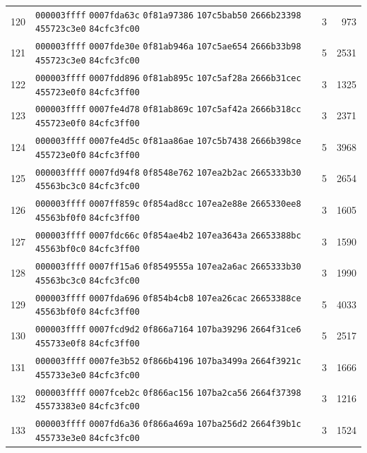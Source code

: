 \begin{longtable}{@{}r p{12cm} r r@{}}
120 & \texttt{000003ffff} \texttt{0007fda63c} \texttt{0f81a97386} \texttt{107c5bab50} \texttt{2666b23398} \texttt{455723c3e0} \texttt{84cfc3fc00} & 3 & 973 \\
121 & \texttt{000003ffff} \texttt{0007fde30e} \texttt{0f81ab946a} \texttt{107c5ae654} \texttt{2666b33b98} \texttt{455723c3e0} \texttt{84cfc3fc00} & 5 & 2531 \\
122 & \texttt{000003ffff} \texttt{0007fdd896} \texttt{0f81ab895c} \texttt{107c5af28a} \texttt{2666b31cec} \texttt{455723e0f0} \texttt{84cfc3ff00} & 3 & 1325 \\
123 & \texttt{000003ffff} \texttt{0007fe4d78} \texttt{0f81ab869c} \texttt{107c5af42a} \texttt{2666b318cc} \texttt{455723e0f0} \texttt{84cfc3ff00} & 3 & 2371 \\
124 & \texttt{000003ffff} \texttt{0007fe4d5c} \texttt{0f81aa86ae} \texttt{107c5b7438} \texttt{2666b398ce} \texttt{455723e0f0} \texttt{84cfc3ff00} & 5 & 3968 \\
125 & \texttt{000003ffff} \texttt{0007fd94f8} \texttt{0f8548e762} \texttt{107ea2b2ac} \texttt{2665333b30} \texttt{45563bc3c0} \texttt{84cfc3fc00} & 5 & 2654 \\
126 & \texttt{000003ffff} \texttt{0007ff859c} \texttt{0f854ad8cc} \texttt{107ea2e88e} \texttt{2665330ee8} \texttt{45563bf0f0} \texttt{84cfc3ff00} & 3 & 1605 \\
127 & \texttt{000003ffff} \texttt{0007fdc66c} \texttt{0f854ae4b2} \texttt{107ea3643a} \texttt{26653388bc} \texttt{45563bf0c0} \texttt{84cfc3ff00} & 3 & 1590 \\
128 & \texttt{000003ffff} \texttt{0007ff15a6} \texttt{0f8549555a} \texttt{107ea2a6ac} \texttt{2665333b30} \texttt{45563bc3c0} \texttt{84cfc3fc00} & 3 & 1990 \\
129 & \texttt{000003ffff} \texttt{0007fda696} \texttt{0f854b4cb8} \texttt{107ea26cac} \texttt{26653388ce} \texttt{45563bf0f0} \texttt{84cfc3ff00} & 5 & 4033 \\
130 & \texttt{000003ffff} \texttt{0007fcd9d2} \texttt{0f866a7164} \texttt{107ba39296} \texttt{2664f31ce6} \texttt{455733e0f8} \texttt{84cfc3ff00} & 5 & 2517 \\
131 & \texttt{000003ffff} \texttt{0007fe3b52} \texttt{0f866b4196} \texttt{107ba3499a} \texttt{2664f3921c} \texttt{455733e3e0} \texttt{84cfc3fc00} & 3 & 1666 \\
132 & \texttt{000003ffff} \texttt{0007fceb2c} \texttt{0f866ac156} \texttt{107ba2ca56} \texttt{2664f37398} \texttt{45573383e0} \texttt{84cfc3fc00} & 3 & 1216 \\
133 & \texttt{000003ffff} \texttt{0007fd6a36} \texttt{0f866a469a} \texttt{107ba256d2} \texttt{2664f39b1c} \texttt{455733e3e0} \texttt{84cfc3fc00} & 3 & 1524 \\

\end{longtable}
